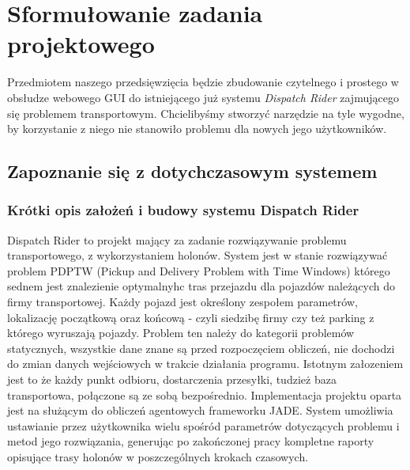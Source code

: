 \chapter{Sformułowanie zadania projektowego}
Przedmiotem naszego przedsięwzięcia będzie zbudowanie czytelnego 
i prostego w obsłudze webowego GUI do istniejącego już systemu
\emph{Dispatch Rider} zajmującego się problemem transportowym.
Chcielibyśmy stworzyć narzędzie na tyle wygodne, by korzystanie z
niego nie stanowiło problemu dla nowych jego użytkowników.

\section{Zapoznanie się z dotychczasowym systemem}

\subsection{Krótki opis założeń i budowy systemu Dispatch Rider}
Dispatch Rider to projekt mający za zadanie rozwiązywanie problemu transportowego, z wykorzystaniem holonów. System jest w stanie rozwiązywać problem PDPTW (Pickup and Delivery Problem with Time Windows) którego sednem jest znalezienie optymalnyhc tras przejazdu dla pojazdów należących do firmy transportowej. Każdy pojazd jest określony zespołem parametrów, lokalizację początkową oraz końcową - czyli siedzibę firmy czy też parking z którego wyruszają pojazdy.
Problem ten należy do kategorii problemów statycznych, wszystkie dane znane są przed rozpoczęciem obliczeń, nie dochodzi do zmian danych wejściowych w trakcie działania programu. Istotnym załozeniem jest to że każdy punkt odbioru, dostarczenia przesyłki, tudzież baza transportowa, połączone są ze sobą bezpośrednio. 
Implementacja projektu oparta jest na służącym do obliczeń agentowych frameworku JADE. System umożliwia ustawianie przez użytkownika wielu spośród parametrów dotyczących problemu i metod jego rozwiązania, generując po zakończonej pracy kompletne raporty opisujące trasy holonów w poszczególnych krokach czasowych. 

